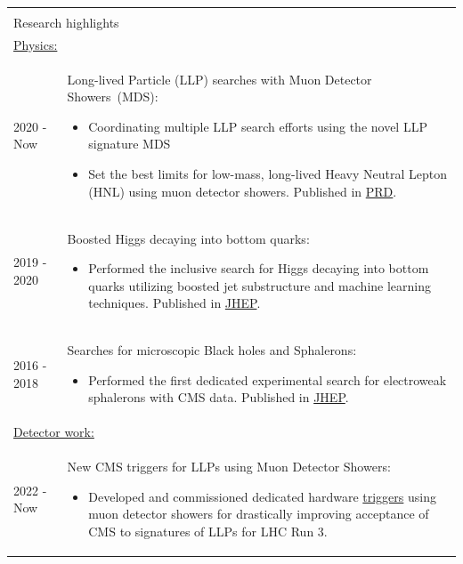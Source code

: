 \documentclass[letterpaper,11pt,oneside]{article}
\begin{document}
{\begin{tabular}{p{0.12\linewidth}  p{0.88\linewidth}}
&\\
\multicolumn{2}{l}{ \Large{Research highlights} }   \\ \hline
\multicolumn{2}{l}{  \underline{Physics:}  }   \\ 
2020 - Now   & Long-lived Particle (LLP) searches with Muon Detector Showers~(MDS):
            \begin{itemize}[nosep]
                \item Coordinating multiple LLP search efforts using the novel LLP signature MDS
                \item Set the best limits for low-mass, long-lived Heavy Neutral Lepton (HNL) using muon detector showers. Published in \href{https://doi.org/10.1103/PhysRevD.110.012004}{PRD}.
            \end{itemize} \vspace*{-10pt}\\
2019 - 2020  & Boosted Higgs decaying into bottom quarks: 
            \begin{itemize}[nosep]
                \item Performed the inclusive search for Higgs decaying into bottom quarks utilizing boosted jet substructure and machine learning techniques. Published in \href{https://link.springer.com/article/10.1007/JHEP12(2020)085}{JHEP}.
            \end{itemize} \vspace*{-10pt}\\
2016 - 2018  & Searches for microscopic Black holes and Sphalerons:
            \begin{itemize}[nosep]
                \item{Performed the first dedicated experimental search for electroweak sphalerons with CMS data. Published in \href{https://link.springer.com/article/10.1007/JHEP11(2018)042}{JHEP}.}
            \end{itemize} \vspace*{-10pt}\\                  
\multicolumn{2}{l}{ \underline{Detector work:}  }   \\ 
2022 - Now   & New CMS triggers for LLPs using Muon Detector Showers:
            \begin{itemize}[nosep]
                \item Developed and commissioned dedicated hardware \href{https://cds.cern.ch/record/2842376?ln=en}{triggers} using muon detector showers for drastically improving acceptance of CMS to signatures of LLPs for LHC Run 3.

\end{itemize}
\end{tabular}}
\end{document}
